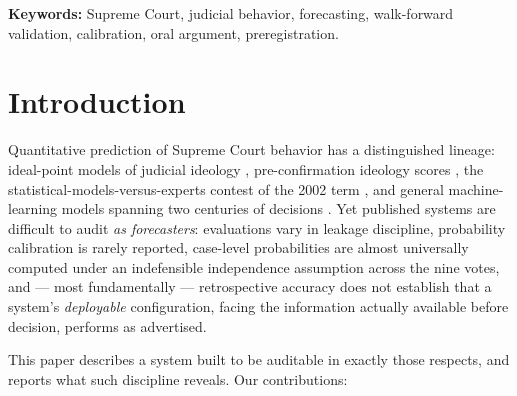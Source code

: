 \documentclass[11pt]{article}
\begin{document}
\vspace{.5em}
\noindent\textbf{Keywords:} Supreme Court, judicial behavior, forecasting,
walk-forward validation, calibration, oral argument, preregistration.

\section{Introduction}

Quantitative prediction of Supreme Court behavior has a distinguished lineage:
ideal-point models of judicial ideology \citep{martinquinn2002}, pre-confirmation
ideology scores \citep{segalcover1989}, the statistical-models-versus-experts
contest of the 2002 term \citep{ruger2004}, and general machine-learning models
spanning two centuries of decisions \citep{katz2017}. Yet published systems are
difficult to audit \emph{as forecasters}: evaluations vary in leakage discipline,
probability calibration is rarely reported, case-level probabilities are almost
universally computed under an indefensible independence assumption across the
nine votes, and --- most fundamentally --- retrospective accuracy does not
establish that a system's \emph{deployable} configuration, facing the information
actually available before decision, performs as advertised.

This paper describes a system built to be auditable in exactly those respects,
and reports what such discipline reveals. Our contributions:
\end{document}
